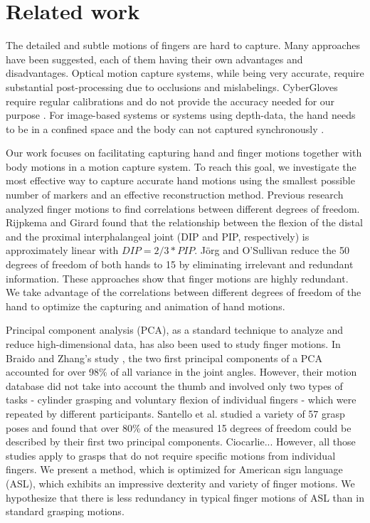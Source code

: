 
\section{Related work}

The detailed and subtle motions of fingers are hard to capture. Many approaches have been suggested, each of them having their own advantages and disadvantages. Optical motion capture systems, while being very accurate, require substantial post-processing due to occlusions and mislabelings. CyberGloves \cite{Cyb13} require regular calibrations and do not provide the accuracy needed for our purpose \cite{KahZacKle04}. For image-based systems or systems using depth-data, the hand needs to be in a confined space and the body can not captured synchronously \cite{WanPop09,ZhaChaXu12}. 

Our work focuses on facilitating capturing hand and finger motions together with body motions in a motion capture system. To reach this goal, we investigate the most effective way to capture accurate hand motions using the smallest possible number of markers and an effective reconstruction method. Previous research analyzed finger motions to find correlations between different degrees of freedom. Rijpkema and Girard  found that the relationship between the flexion of the distal and the proximal interphalangeal joint (DIP and PIP, respectively) is approximately linear with $DIP=2/3*PIP$. J\"{o}rg and O'Sullivan  reduce the 50 degrees of freedom of both hands to 15 by eliminating irrelevant and redundant information. These approaches show that finger motions are highly redundant. We take advantage of the correlations between different degrees of freedom of the hand to optimize the capturing and animation of hand motions. 

Principal component analysis (PCA), as a standard technique to analyze and reduce high-dimensional data, has also been used to study finger motions. In Braido and Zhang's study , the two first principal components of a PCA accounted for over 98\% of all variance in the joint angles. However, their motion database did not take into account the thumb and involved only two types of tasks - cylinder grasping and voluntary flexion of individual fingers - which were repeated by different participants. Santello et al.  studied a variety of 57 grasp poses and found that over 80\% of the measured 15 degrees of freedom could be described by their first two principal components. Ciocarlie...
However, all those studies apply to grasps that do not require specific motions from individual fingers. We present a method, which is optimized for American sign language (ASL), which exhibits an impressive dexterity and variety of finger motions. We hypothesize that there is less redundancy in typical finger motions of ASL than in standard grasping motions. 

